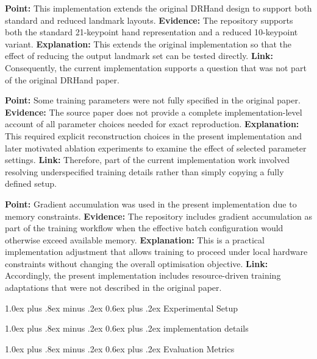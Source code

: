\documentclass[10pt,letterpaper]{article}
\makeatletter
\renewcommand\subsection{\@startsection{subsection}{2}{\z@}%
  {1.0ex plus .8ex minus .2ex}%
  {0.6ex plus .2ex}%
  {\normalfont\itshape}}
\makeatother
\begin{document}
\medskip
\noindent\textbf{Point:} This implementation extends the original DRHand design to support both standard and reduced landmark layouts.  
\textbf{Evidence:} The repository supports both the standard 21-keypoint hand representation and a reduced 10-keypoint variant.  
\textbf{Explanation:} This extends the original implementation so that the effect of reducing the output landmark set can be tested directly.  
\textbf{Link:} Consequently, the current implementation supports a question that was not part of the original DRHand paper.

\medskip
\noindent\textbf{Point:} Some training parameters were not fully specified in the original paper.  
\textbf{Evidence:} The source paper does not provide a complete implementation-level account of all parameter choices needed for exact reproduction.  
\textbf{Explanation:} This required explicit reconstruction choices in the present implementation and later motivated ablation experiments to examine the effect of selected parameter settings.  
\textbf{Link:} Therefore, part of the current implementation work involved resolving underspecified training details rather than simply copying a fully defined setup.

\medskip
\noindent\textbf{Point:} Gradient accumulation was used in the present implementation due to memory constraints.  
\textbf{Evidence:} The repository includes gradient accumulation as part of the training workflow when the effective batch configuration would otherwise exceed available memory.  
\textbf{Explanation:} This is a practical implementation adjustment that allows training to proceed under local hardware constraints without changing the overall optimisation objective.  
\textbf{Link:} Accordingly, the present implementation includes resource-driven training adaptations that were not described in the original paper.

\subsection{Experimental Setup}

\subsection{implementation details}  

\subsection{Evaluation Metrics}
\end{document}
